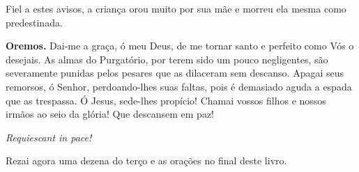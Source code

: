 Fiel a estes avisos, a criança orou muito por sua mãe e morreu ela mesma como predestinada.


\vspace{\baselineskip}\noindent \textbf{Oremos.} Dai-me a graça, ó meu Deus, de me tornar santo e perfeito como Vós o desejais. As almas do Purgatório, por terem sido um pouco negligentes, são severamente punidas pelos pesares que as dilaceram sem descanso. Apagai seus remorsos, ó Senhor, perdoando-lhes suas faltas, pois é demasiado aguda a espada que as trespassa. Ó Jesus, sede-lhes propício! Chamai vossos filhos e nossos irmãos ao seio da glória! Que descansem em paz!



\begin{center}
\textit{Requiescant in pace!}
\end{center}

Rezai agora uma dezena do terço e as orações no final deste livro.
